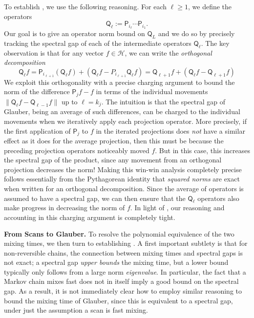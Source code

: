 \documentclass[11pt]{article}
\begin{document}
To establish , we use the following reasoning. For each $\ell\geq 1$, we define the operators 
\begin{equation*}
    \mathsf{Q}_{\ell}:=\mathsf{P}_{i_{\ell}}\cdots \mathsf{P}_{i_1}.
\end{equation*}
Our goal is to give an operator norm bound on $\mathsf{Q}_L$ and we do so by precisely tracking the spectral gap of each of the intermediate operators $\mathsf{Q}_{\ell}$. The key observation is that for any vector $f\in \mathcal{H}$, we can write the \emph{orthogonal decomposition}
\begin{equation*}
        \mathsf{Q}_{{\ell}}f = \mathsf{P}_{i_{\ell+1}}( \mathsf{Q}_{{\ell}}f)+(\mathsf{Q}_{{\ell}}f-P_{i_{\ell+1}}\mathsf{Q}_{{\ell}} f)= \mathsf{Q}_{{\ell+1}}f+(\mathsf{Q}_{{\ell}}f-\mathsf{Q}_{{\ell+1}} f)
    \end{equation*}
We exploit this orthogonality with a precise charging argument to bound the norm of the difference $\mathsf{P}_jf-f$ in terms of the individual movements $\|\mathsf{Q}_{\ell}f-\mathsf{Q}_{\ell-1}f\|$ up to $\ell=k_j$. The intuition is that the spectral gap of Glauber, being an average of such differences, can be charged to the individual movements when we iteratively apply each projection operator. More precisely, if the first application of $\mathsf{P}_j$ to $f$ in the iterated projections does \emph{not} have a similar effect as it does for the average projection, then this must be because the preceding projection operators noticeably moved $f$. But in this case, this increases the spectral gap of the product, since any movement from an orthogonal projection decreases the norm! Making this win-win analysis completely precise follows essentially from the Pythagorean identity that \emph{squared norms} are exact when written for an orthogonal decomposition. Since the average of operators is assumed to have a spectral gap, we can then ensure that the $\mathsf{Q}_{\ell}$ operators also make progress in decreasing the norm of $f$. In light of , our reasoning and accounting in this charging argument is completely tight.

\noindent\textbf{From Scans to Glauber.} To resolve the polynomial equivalence of the two mixing times, we then turn to establishing .
A first important subtlety is that for non-reversible chains, the connection between mixing times and spectral gaps is not exact; a spectral gap \emph{upper bounds} the mixing time, but a lower bound typically only follows from a large norm \emph{eigenvalue}. In particular, the fact that a Markov chain mixes fast does not in itself imply a good bound on the spectral gap. As a result, it is not immediately clear how to employ similar reasoning to bound the mixing time of Glauber, since this is equivalent to a spectral gap, under just the assumption a scan is fast mixing. 
\end{document}
